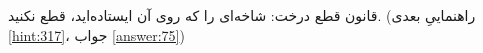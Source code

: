 \section{}
\paragraph{}\label{hint:8}
قانون قطع درخت: شاخه‌ای را که روی آن ایستاده‌اید، قطع نکنید. (راهنماییِ بعدی \ref{hint:317}، جواب \ref{answer:75})